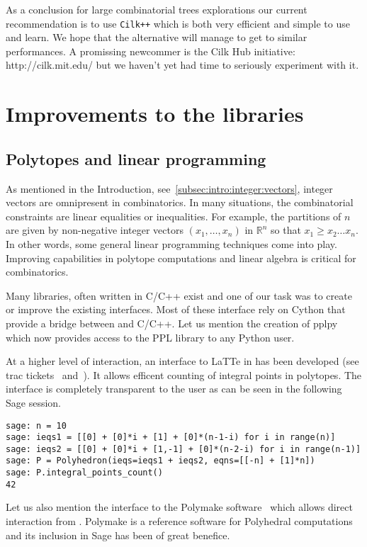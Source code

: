 \documentclass{deliverablereport}
\newcommand{\CilkP}{\texttt{Cilk++}\xspace}
\begin{document}
As a conclusion for large combinatorial trees explorations our current
recommendation is to use \CilkP which is both very efficient and simple to use
and learn. We hope that the alternative will manage to get to similar
performances. A promissing newcommer is the Cilk Hub initiative:
http://cilk.mit.edu/ but we haven't yet had time to seriously experiment with
it.




\section{Improvements to the \Sage libraries}


\subsection{Polytopes and linear programming}
\label{subsec:polytopes}

As mentioned in the Introduction, see~\ref{subsec:intro:integer:vectors},
integer vectors are omnipresent in combinatorics. In many situations,
the combinatorial constraints are linear equalities or inequalities.
For example, the partitions of $n$ are given by non-negative integer
vectors $(x_1, \ldots, x_n)$ in $\mathbb{R}^n$ so that $x_1 \geq x_2 \ldots x_n$.
In other words, some general linear programming techniques come into
play. Improving \Sage capabilities in polytope computations and linear algebra
is critical for combinatorics.

Many libraries, often written in C/C++ exist and one of our task was to
create or improve the existing \Sage interfaces. Most of these interface
rely on Cython that provide a bridge between \Python and C/C++. Let
us mention the creation of pplpy~\cite{pplpy-code} which now provides
access to the PPL library to any Python user.

At a higher level of interaction, an interface to LaTTe in \Sage has
been developed (see trac tickets~\cite{trac-18211}
and~\cite{trac-22497}). It allows efficent counting of
integral points in polytopes. The interface is completely transparent to the
user as can be seen in the following Sage session.
\begin{verbatim}
sage: n = 10
sage: ieqs1 = [[0] + [0]*i + [1] + [0]*(n-1-i) for i in range(n)]
sage: ieqs2 = [[0] + [0]*i + [1,-1] + [0]*(n-2-i) for i in range(n-1)]
sage: P = Polyhedron(ieqs=ieqs1 + ieqs2, eqns=[[-n] + [1]*n])
sage: P.integral_points_count()
42
\end{verbatim}
Let us also mention the \Sage interface to the Polymake
software~\cite{polymake-code} which allows direct interaction from
\Sage. Polymake is a reference software for Polyhedral computations
and its inclusion in Sage has been of great benefice.
\end{document}
